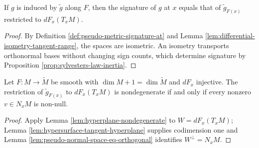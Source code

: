 \begin{lemma}
\label{lem:submanifold-signature-in-ambient-fibre}





If $g$ is induced by $\widetilde g$ along $F$, then the signature of $g$ at $x$ equals that of $\widetilde g_{F(x)}$ restricted to $dF_x(T_xM)$.
\end{lemma}
\begin{proof}

\sketch By Definition \ref{def:pseudo-metric-signature-at} and Lemma \ref{lem:differential-isometry-tangent-range}, the spaces are isometric. An isometry transports orthonormal bases without changing sign counts, which determine signature by Proposition \ref{prop:sylvesters-law-inertia}.
\end{proof}

\begin{proposition}
\label{prop:pseudo-riemannian-hypersurface-nondegenerate}





Let $F:M\to\widetilde M$ be smooth with $\dim M+1=\dim\widetilde M$ and $dF_x$ injective. The restriction of $\widetilde g_{F(x)}$ to $dF_x(T_xM)$ is nondegenerate if and only if every nonzero $v\in N_xM$ is non-null.
\end{proposition}
\begin{proof}

\sketch Apply Lemma \ref{lem:hyperplane-nondegenerate} to $W=dF_x(T_xM)$; Lemma \ref{lem:hypersurface-tangent-hyperplane} supplies codimension one and Lemma \ref{lem:pseudo-normal-space-eq-orthogonal} identifies $W^\perp=N_xM$.
\end{proof}

